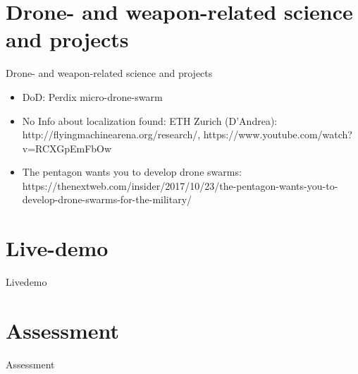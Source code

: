 \documentclass[aspectratio=169]{beamer}
\begin{document}
\section{Drone- and weapon-related science and projects}
\begin{frame}{Drone- and weapon-related science and projects}
	\begin{itemize}
		\item DoD: Perdix micro-drone-swarm
		\item No Info about localization found: ETH Zurich (D'Andrea): http://flyingmachinearena.org/research/, https://www.youtube.com/watch?v=RCXGpEmFbOw
        \item The pentagon wants you to develop drone swarms: https://thenextweb.com/insider/2017/10/23/the-pentagon-wants-you-to-develop-drone-swarms-for-the-military/
	\end{itemize}
\end{frame}

\section{Live-demo}
\begin{frame}{Livedemo}
\end{frame}

\section{Assessment}
\begin{frame}{Assessment}
\end{frame}
\end{document}
